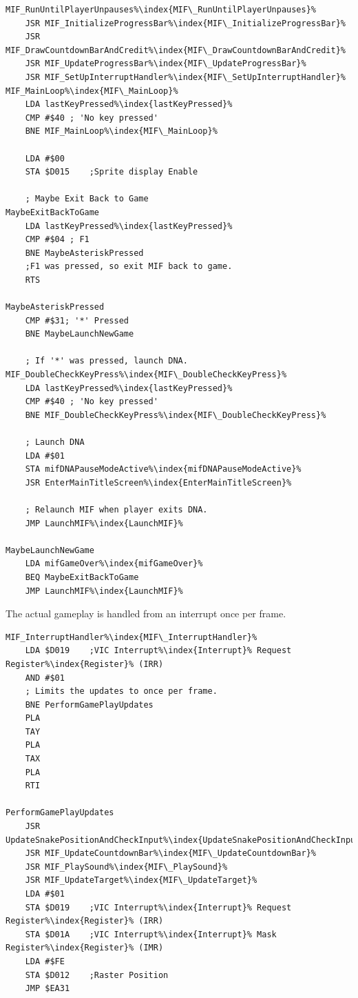 \begin{lstlisting}[escapechar=\%]
MIF_RunUntilPlayerUnpauses%\index{MIF\_RunUntilPlayerUnpauses}%   
    JSR MIF_InitializeProgressBar%\index{MIF\_InitializeProgressBar}%
    JSR MIF_DrawCountdownBarAndCredit%\index{MIF\_DrawCountdownBarAndCredit}%
    JSR MIF_UpdateProgressBar%\index{MIF\_UpdateProgressBar}%
    JSR MIF_SetUpInterruptHandler%\index{MIF\_SetUpInterruptHandler}%
MIF_MainLoop%\index{MIF\_MainLoop}%
    LDA lastKeyPressed%\index{lastKeyPressed}%
    CMP #$40 ; 'No key pressed'
    BNE MIF_MainLoop%\index{MIF\_MainLoop}%

    LDA #$00
    STA $D015    ;Sprite display Enable

    ; Maybe Exit Back to Game
MaybeExitBackToGame
    LDA lastKeyPressed%\index{lastKeyPressed}%
    CMP #$04 ; F1
    BNE MaybeAsteriskPressed
    ;F1 was pressed, so exit MIF back to game.
    RTS 

MaybeAsteriskPressed
    CMP #$31; '*' Pressed
    BNE MaybeLaunchNewGame

    ; If '*' was pressed, launch DNA.
MIF_DoubleCheckKeyPress%\index{MIF\_DoubleCheckKeyPress}%
    LDA lastKeyPressed%\index{lastKeyPressed}%
    CMP #$40 ; 'No key pressed'
    BNE MIF_DoubleCheckKeyPress%\index{MIF\_DoubleCheckKeyPress}%

    ; Launch DNA
    LDA #$01
    STA mifDNAPauseModeActive%\index{mifDNAPauseModeActive}%
    JSR EnterMainTitleScreen%\index{EnterMainTitleScreen}%

    ; Relaunch MIF when player exits DNA.
    JMP LaunchMIF%\index{LaunchMIF}%

MaybeLaunchNewGame
    LDA mifGameOver%\index{mifGameOver}%
    BEQ MaybeExitBackToGame
    JMP LaunchMIF%\index{LaunchMIF}%
\end{lstlisting}

The actual gameplay is handled from an interrupt once per frame.

\begin{lstlisting}[escapechar=\%]
MIF_InterruptHandler%\index{MIF\_InterruptHandler}%   
    LDA $D019    ;VIC Interrupt%\index{Interrupt}% Request Register%\index{Register}% (IRR)
    AND #$01
    ; Limits the updates to once per frame.
    BNE PerformGamePlayUpdates
    PLA 
    TAY 
    PLA 
    TAX 
    PLA 
    RTI 

PerformGamePlayUpdates
    JSR UpdateSnakePositionAndCheckInput%\index{UpdateSnakePositionAndCheckInput}%
    JSR MIF_UpdateCountdownBar%\index{MIF\_UpdateCountdownBar}%
    JSR MIF_PlaySound%\index{MIF\_PlaySound}%
    JSR MIF_UpdateTarget%\index{MIF\_UpdateTarget}%
    LDA #$01
    STA $D019    ;VIC Interrupt%\index{Interrupt}% Request Register%\index{Register}% (IRR)
    STA $D01A    ;VIC Interrupt%\index{Interrupt}% Mask Register%\index{Register}% (IMR)
    LDA #$FE
    STA $D012    ;Raster Position
    JMP $EA31
\end{lstlisting}

